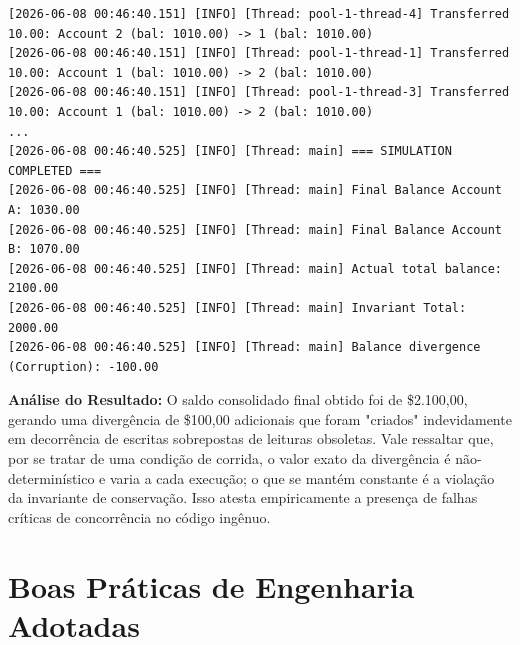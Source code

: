 \documentclass[12pt,a4paper]{article}
\begin{document}
\begin{lstlisting}[caption={Log de Execução Expondo a Condição de Corrida}]
[2026-06-08 00:46:40.151] [INFO] [Thread: pool-1-thread-4] Transferred 10.00: Account 2 (bal: 1010.00) -> 1 (bal: 1010.00)
[2026-06-08 00:46:40.151] [INFO] [Thread: pool-1-thread-1] Transferred 10.00: Account 1 (bal: 1010.00) -> 2 (bal: 1010.00)
[2026-06-08 00:46:40.151] [INFO] [Thread: pool-1-thread-3] Transferred 10.00: Account 1 (bal: 1010.00) -> 2 (bal: 1010.00)
...
[2026-06-08 00:46:40.525] [INFO] [Thread: main] === SIMULATION COMPLETED ===
[2026-06-08 00:46:40.525] [INFO] [Thread: main] Final Balance Account A: 1030.00
[2026-06-08 00:46:40.525] [INFO] [Thread: main] Final Balance Account B: 1070.00
[2026-06-08 00:46:40.525] [INFO] [Thread: main] Actual total balance: 2100.00
[2026-06-08 00:46:40.525] [INFO] [Thread: main] Invariant Total: 2000.00
[2026-06-08 00:46:40.525] [INFO] [Thread: main] Balance divergence (Corruption): -100.00
\end{lstlisting}

\noindent \textbf{Análise do Resultado:} O saldo consolidado final obtido foi de \$2.100,00, gerando uma divergência de \$100,00 adicionais que foram "criados" indevidamente em decorrência de escritas sobrepostas de leituras obsoletas. Vale ressaltar que, por se tratar de uma condição de corrida, o valor exato da divergência é não-determinístico e varia a cada execução; o que se mantém constante é a violação da invariante de conservação. Isso atesta empiricamente a presença de falhas críticas de concorrência no código ingênuo.

\section{Boas Práticas de Engenharia Adotadas}
\end{document}
